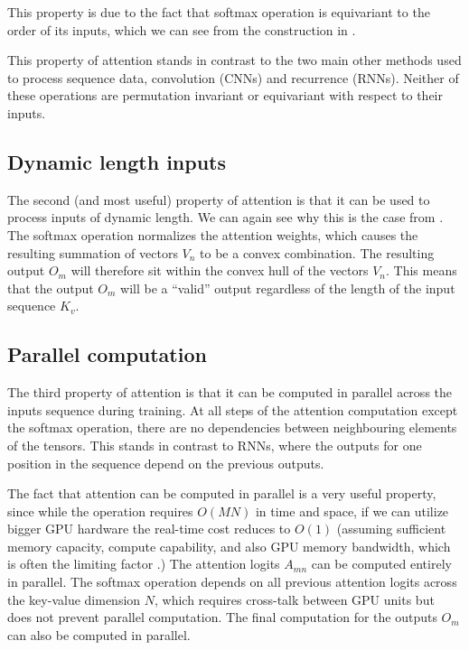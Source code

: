 This property is due to the fact that softmax operation is equivariant to the order of its inputs, which we can see from the construction in .

This property of attention stands in contrast to the two main other methods used to process sequence data, convolution (CNNs) and recurrence (RNNs). Neither of these operations are permutation invariant or equivariant with respect to their inputs.

\subsection{Dynamic length inputs}

The second (and most useful) property of attention is that it can be used to process inputs of dynamic length. We can again see why this is the case from . The softmax operation normalizes the attention weights, which causes the resulting summation of vectors $V_n$ to be a convex combination. The resulting output $O_m$ will therefore sit within the convex hull of the vectors $V_n$. This means that the output $O_m$ will be a ``valid'' output regardless of the length of the input sequence $K_v$.

\subsection{Parallel computation}

The third property of attention is that it can be computed in parallel across the inputs sequence during training. At all steps of the attention computation except the softmax operation, there are no dependencies between neighbouring elements of the tensors. This stands in contrast to RNNs, where the outputs for one position in the sequence depend on the previous outputs.

The fact that attention can be computed in parallel is a very useful property, since while the operation requires $O(MN)$ in time and space, if we can utilize bigger GPU hardware the real-time cost reduces to $O(1)$ (assuming sufficient memory capacity, compute capability, and also GPU memory bandwidth, which is often the limiting factor \cite{multi-query-attn}.) The attention logits $A_{mn}$ can be computed entirely in parallel. The softmax operation depends on all previous attention logits across the key-value dimension $N$, which requires cross-talk between GPU units but does not prevent parallel computation. The final computation for the outputs $O_m$ can also be computed in parallel.

